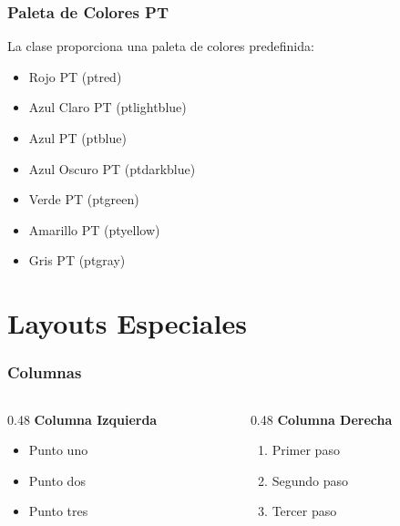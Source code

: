 \documentclass{pt-slides}
\begin{document}
\begin{frame}
    \frametitle{Paleta de Colores PT}

    La clase proporciona una paleta de colores predefinida:

    \begin{itemize}
        \item \textcolor{ptred}{Rojo PT (ptred)}
        \item \textcolor{ptlightblue}{Azul Claro PT (ptlightblue)}
        \item \textcolor{ptblue}{Azul PT (ptblue)}
        \item \textcolor{ptdarkblue}{Azul Oscuro PT (ptdarkblue)}
        \item \textcolor{ptgreen}{Verde PT (ptgreen)}
        \item \textcolor{ptyellow}{Amarillo PT (ptyellow)}
        \item \textcolor{ptgray}{Gris PT (ptgray)}
    \end{itemize}
\end{frame}

\section{Layouts Especiales}

\begin{frame}
    \frametitle{Columnas}

    \begin{columns}
        \begin{column}{0.48\textwidth}
            \textbf{Columna Izquierda}
            \begin{itemize}
                \item Punto uno
                \item Punto dos
                \item Punto tres
            \end{itemize}
        \end{column}
        \begin{column}{0.48\textwidth}
            \textbf{Columna Derecha}
            \begin{enumerate}
                \item Primer paso
                \item Segundo paso
                \item Tercer paso
            \end{enumerate}
        \end{column}
    \end{columns}
\end{frame}
\end{document}
